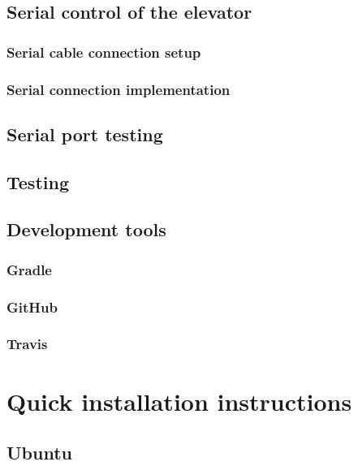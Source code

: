 \documentclass[a4paper, 12pt]{article}
\begin{document}
\subsection{Serial control of the elevator}

\subsubsection{Serial cable connection setup}

\subsubsection{Serial connection implementation}

\subsection{Serial port testing}

\subsection{Testing}
\subsection{Development tools}

\subsubsection{Gradle}

\subsubsection{GitHub}

\subsubsection{Travis}


\section{Quick installation instructions}
\subsection{Ubuntu}




\end{document}
